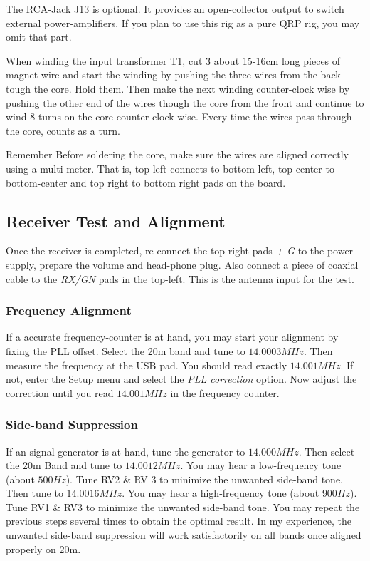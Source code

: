 \documentclass[10pt, a4paper]{scrartcl}
\newenvironment{remember}{\begin{bclogo}[couleur=blue!30,arrondi=.1,logo=\bccrayon,ombre=true]{Remember}}{\end{bclogo}}
\begin{document}
The RCA-Jack J13 is optional. It provides an open-collector output to switch external power-amplifiers. If you plan to use this rig as a pure QRP rig, you may omit that part.

When winding the input transformer T1, cut 3 about 15-16cm long pieces of magnet wire and start the winding by pushing the three wires from the back tough the core. Hold them. Then make the next winding counter-clock wise by pushing the other end of the wires though the core from the front and continue to wind 8 turns on the core counter-clock wise. Every time the wires pass through the core, counts as a turn. 

\begin{remember}
Before soldering the core, make sure the wires are aligned correctly using a multi-meter. That is, top-left connects to bottom left, top-center to bottom-center and top right to bottom right pads on the board. 
\end{remember}

\subsection{Receiver Test and Alignment}
Once the receiver is completed, re-connect the top-right pads \emph{+ G} to the power-supply, prepare the volume and head-phone plug. Also connect a piece of coaxial cable to the \emph{RX/GN} pads in the top-left. This is the antenna input for the test. 

\subsubsection{Frequency Alignment}
If a accurate frequency-counter is at hand, you may start your alignment by fixing the PLL offset. Select the 20m band and tune to $14.0003 MHz$. Then measure the frequency at the USB pad. You should read exactly $14.001 MHz$. If not, enter the Setup menu and select the \emph{PLL correction} option. Now adjust the correction until you read $14.001 MHz$ in the frequency counter.

\subsubsection{Side-band Suppression}
If an signal generator is at hand, tune the generator to $14.000 MHz$. Then select the 20m Band and tune to $14.0012 MHz$. You may hear a low-frequency tone (about $500Hz$). Tune RV2 \& RV 3 to minimize the unwanted side-band tone. Then tune to $14.0016 MHz$. You may hear a high-frequency tone (about $900 Hz$). Tune RV1 \& RV3 to minimize the unwanted side-band tone. You may repeat the previous steps several times to obtain the optimal result. In my experience, the unwanted side-band suppression will work satisfactorily on all bands once aligned properly on 20m. 
\end{document}
